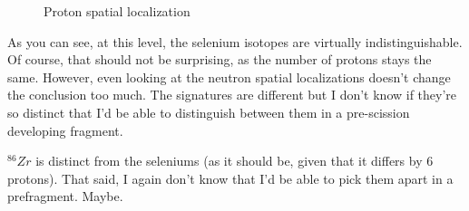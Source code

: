 \begin{figure}
  \begin{center}
    \label{fig:86Zr-p-locali}
    \label{fig:84Se-p-locali}
    \label{fig:82Se-p-locali}
  \end{center}
  \caption{Proton spatial localization}
\end{figure}


As you can see, at this level, the selenium isotopes are virtually indistinguishable. Of course, that should not be surprising, as the number of protons stays the same. However, even looking at the neutron spatial localizations doesn't change the conclusion too much. The signatures are different but I don't know if they're so distinct that I'd be able to distinguish between them in a pre-scission developing fragment.

$^{86}Zr$ is distinct from the seleniums (as it should be, given that it differs by 6 protons). That said, I again don't know that I'd be able to pick them apart in a prefragment. Maybe.